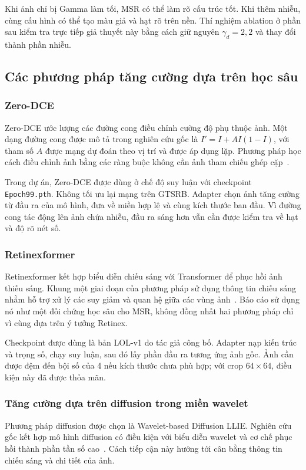 Khi ảnh chỉ bị Gamma làm tối, MSR có thể làm rõ cấu trúc tốt. Khi thêm nhiễu, cùng cấu hình có thể tạo màu giả và hạt rõ trên nền. Thí nghiệm ablation ở phần sau kiểm tra trực tiếp giả thuyết này bằng cách giữ nguyên $\gamma_d=2,2$ và thay đổi thành phần nhiễu.

\subsection{Các phương pháp tăng cường dựa trên học sâu}
\subsubsection{Zero-DCE}
Zero-DCE ước lượng các đường cong điều chỉnh cường độ phụ thuộc ảnh. Một dạng đường cong được mô tả trong nghiên cứu gốc là $I'=I+A I(1-I)$, với tham số $A$ được mạng dự đoán theo vị trí và được áp dụng lặp. Phương pháp học cách điều chỉnh ảnh bằng các ràng buộc không cần ảnh tham chiếu ghép cặp~\cite{zerodce}.

Trong dự án, Zero-DCE được dùng ở chế độ suy luận với checkpoint \texttt{Epoch99.pth}. Không tối ưu lại mạng trên GTSRB. Adapter chọn ảnh tăng cường từ đầu ra của mô hình, đưa về miền hợp lệ và cùng kích thước ban đầu. Vì đường cong tác động lên ảnh chứa nhiễu, đầu ra sáng hơn vẫn cần được kiểm tra về hạt và độ rõ nét số.

\subsubsection{Retinexformer}
Retinexformer kết hợp biểu diễn chiếu sáng với Transformer để phục hồi ảnh thiếu sáng. Khung một giai đoạn của phương pháp sử dụng thông tin chiếu sáng nhằm hỗ trợ xử lý các suy giảm và quan hệ giữa các vùng ảnh~\cite{retinexformer}. Báo cáo sử dụng nó như một đối chứng học sâu cho MSR, không đồng nhất hai phương pháp chỉ vì cùng dựa trên ý tưởng Retinex.

Checkpoint được dùng là bản LOL-v1 do tác giả công bố. Adapter nạp kiến trúc và trọng số, chạy suy luận, sau đó lấy phần đầu ra tương ứng ảnh gốc. Ảnh cần được đệm đến bội số của 4 nếu kích thước chưa phù hợp; với crop $64\times64$, điều kiện này đã được thỏa mãn.

\subsubsection{Tăng cường dựa trên diffusion trong miền wavelet}
Phương pháp diffusion được chọn là Wavelet-based Diffusion LLIE. Nghiên cứu gốc kết hợp mô hình diffusion có điều kiện với biểu diễn wavelet và cơ chế phục hồi thành phần tần số cao~\cite{diffusion}. Cách tiếp cận này hướng tới cân bằng thông tin chiếu sáng và chi tiết của ảnh.

